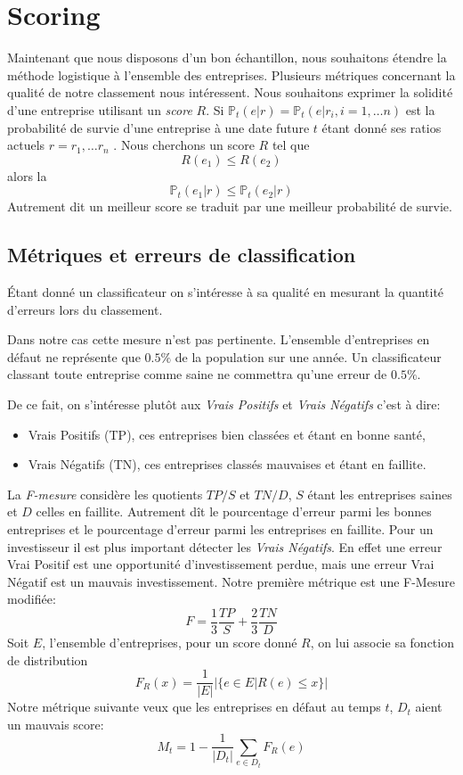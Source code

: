\documentclass[DIV=calc, paper=a4, fontsize=11pt, twocolumn]{scrartcl}
\begin{document}
\section{Scoring}
Maintenant que nous disposons d'un bon échantillon, nous souhaitons étendre la méthode logistique à l'ensemble des entreprises. Plusieurs métriques concernant la qualité de notre classement nous intéressent. Nous souhaitons exprimer la solidité d'une entreprise utilisant un \emph{score} $R$. Si $\mathbb{P}_t(e|r) = \mathbb{P}_t(e| r_i, i=1, \dots n)$ est la probabilité de survie d'une entreprise à une date future $t$ étant donné ses ratios actuels $r = r_1, \ldots r_n$ . Nous cherchons un score $R$ tel que
$$R(e_1) \leq R(e_2)$$
alors la 
$$\mathbb{P}_t(e_1| r) \leq \mathbb{P}_t(e_2| r)$$
Autrement dit un meilleur score se traduit par une meilleur probabilité de survie.
\subsection{Métriques et erreurs de classification}
Étant donné un classificateur on s'intéresse à sa qualité en mesurant la quantité d'erreurs lors du classement. 

Dans notre cas cette mesure n'est pas pertinente. L'ensemble d'entreprises en défaut ne représente que $0.5\%$ de la population sur une année. Un classificateur classant toute entreprise comme saine ne commettra qu'une erreur de $0.5\%$.  

De ce fait, on s'intéresse plutôt aux \emph{Vrais Positifs} et \emph{Vrais Négatifs} c'est à dire:
\begin{itemize}
\item[] Vrais Positifs (TP), ces entreprises bien classées et étant en bonne santé,
\item[] Vrais Négatifs (TN), ces entreprises classés mauvaises et étant en faillite.
\end{itemize}
La \emph{F-mesure} considère les quotients $TP/S$ et $TN/D$, $S$ étant les entreprises saines et $D$ celles en faillite. Autrement dît le pourcentage d'erreur parmi les bonnes entreprises et le pourcentage d'erreur parmi les entreprises en faillite. Pour un investisseur il est plus important détecter les \emph{Vrais Négatifs}. En effet une erreur Vrai Positif est une opportunité d'investissement perdue, mais une erreur Vrai Négatif est un mauvais investissement. Notre première métrique est une F-Mesure modifiée:
$$ F = \frac{1}{3}\frac{TP}{S} + \frac{2}{3}\frac{TN}{D}$$
Soit $E$, l'ensemble d'entreprises, pour un score donné $R$, on lui associe sa fonction de distribution
$$F_R(x) = \frac{1}{|E|} | \{ e \in E | R(e) \leq x \} | $$
Notre métrique suivante veux que les entreprises en défaut au temps $t$, $D_t$ aient un mauvais score:
$$M_t = 1 - \frac{1}{|D_t|} \sum_{e \in D_t} F_R(e)$$
\end{document}
